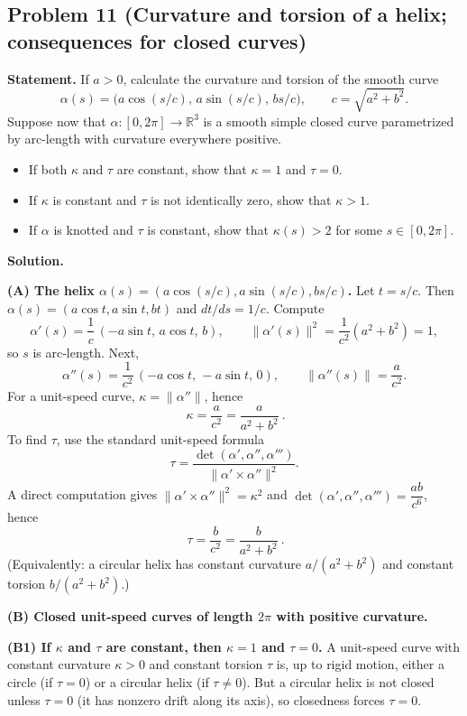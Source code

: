 \documentclass[12pt,a4paper]{article}
\theoremstyle{plain}
\theoremstyle{definition}      %
\begin{document}
	\subsection*{Problem 11 (Curvature and torsion of a helix; consequences for closed curves)}
	
	\textbf{Statement.}
	If $a>0$, calculate the curvature and torsion of the smooth curve
	\[
	\alpha(s)=\bigl(a\cos(s/c),\,a\sin(s/c),\,bs/c\bigr),
	\qquad c=\sqrt{a^2+b^2}.
	\]
	Suppose now that $\alpha:[0,2\pi]\to\mathbb{R}^3$ is a smooth simple closed curve parametrized by arc-length
	with curvature everywhere positive.
	\begin{itemize}
		\item If both $\kappa$ and $\tau$ are constant, show that $\kappa=1$ and $\tau=0$.
		\item If $\kappa$ is constant and $\tau$ is not identically zero, show that $\kappa>1$.
		\item If $\alpha$ is knotted and $\tau$ is constant, show that $\kappa(s)>2$ for some $s\in[0,2\pi]$.
	\end{itemize}
	
	\textbf{Solution.}
	
	\textbf{(A) The helix $\alpha(s)=(a\cos(s/c),a\sin(s/c),bs/c)$.}
	Let $t=s/c$. Then $\alpha(s)=(a\cos t,a\sin t,bt)$ and $dt/ds=1/c$.
	Compute
	\[
	\alpha'(s)=\frac{1}{c}\,(-a\sin t,\,a\cos t,\,b),
	\qquad
	\|\alpha'(s)\|^2=\frac{1}{c^2}(a^2+b^2)=1,
	\]
	so $s$ is arc-length. Next,
	\[
	\alpha''(s)=\frac{1}{c^2}\,(-a\cos t,\,-a\sin t,\,0),
	\qquad
	\|\alpha''(s)\|=\frac{a}{c^2}.
	\]
	For a unit-speed curve, $\kappa=\|\alpha''\|$, hence
	\[
	\boxed{\ \kappa=\dfrac{a}{c^2}=\dfrac{a}{a^2+b^2}\ }.
	\]
	To find $\tau$, use the standard unit-speed formula
	\[
	\tau=\frac{\det(\alpha',\alpha'',\alpha''')}{\|\alpha'\times \alpha''\|^2}.
	\]
	A direct computation gives $\|\alpha'\times\alpha''\|^2=\kappa^2$ and
	$\det(\alpha',\alpha'',\alpha''')=\dfrac{ab}{c^6}$, hence
	\[
	\boxed{\ \tau=\dfrac{b}{c^2}=\dfrac{b}{a^2+b^2}\ }.
	\]
	(Equivalently: a circular helix has constant curvature $a/(a^2+b^2)$ and constant torsion $b/(a^2+b^2)$.)
	
	\medskip
	
	\textbf{(B) Closed unit-speed curves of length $2\pi$ with positive curvature.}
	
	\textbf{(B1) If $\kappa$ and $\tau$ are constant, then $\kappa=1$ and $\tau=0$.}
	A unit-speed curve with constant curvature $\kappa>0$ and constant torsion $\tau$ is, up to rigid motion,
	either a circle (if $\tau=0$) or a circular helix (if $\tau\neq 0$).
	But a circular helix is not closed unless $\tau=0$ (it has nonzero drift along its axis),
	so closedness forces $\tau=0$.
	
\end{document}
